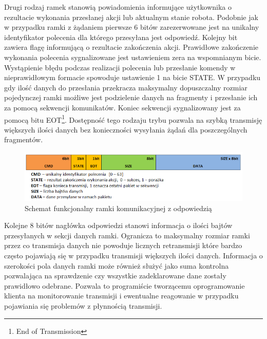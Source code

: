 Drugi rodzaj ramek stanowią powiadomienia informujące użytkownika o rezultacie 
wykonania przesłanej akcji lub aktualnym stanie robota. Podobnie jak w przypadku
ramki z żądaniem pierwsze 6 bitów zarezerwowane jest na unikalny identyfikator
polecenia dla którego przesyłana jest odpowiedź. Kolejny bit zawiera flagę
informującą o rezultacie zakończenia akcji. Prawidłowe zakończenie wykonania
polecenia sygnalizowane jest ustawieniem zera na wspomnianym bicie. Wystąpienie
błędu podczas realizacji polecenia lub przesłanie komendy w nieprawidłowym
formacie spowoduje ustawienie 1 na bicie STATE. W przypadku gdy ilość
danych do przesłania przekracza maksymalny dopuszczalny rozmiar
pojedynczej ramki możliwe jest podzielenie danych na fragmenty i przesłanie ich
za pomocą sekwencji komunikatów. Koniec sekwencji sygnalizowany jest za pomocą
bitu EOT\footnote{End of Transmission}. Dostępność tego rodzaju trybu pozwala
na szybką transmisję większych ilości danych bez konieczności wysyłania żądań dla poszczególnych fragmentów.

\begin{figure}[h!] 
 \centering
 \includegraphics[width=\textwidth]{../images/ch05/resp_schema2.png}
 \caption{Schemat funkcjonalny ramki komunikacyjnej z odpowiedzią}
 \label{fig:RfcommRespFrame}
\end{figure}

Kolejne 8 bitów nagłówka odpowiedzi stanowi informacja o ilości bajtów
przesyłanych w sekcji danych ramki. Ogranicza to maksymalny rozmiar ramki przez
co transmisja danych nie powoduje licznych retransmisji które bardzo często
pojawiają się w przypadku transmisji większych ilości danych. Informacja o
szerokości pola danych ramki może również służyć jako suma kontrolna pozwalająca
na sprawdzenie czy wszystkie zadeklarowane dane zostały prawidłowo odebrane.
Pozwala to programiście tworzącemu oprogramowanie klienta na monitorowanie
transmisji i ewentualne reagowanie w przypadku pojawiania się problemów z
płynnością transmisji. 